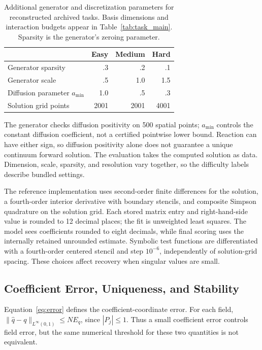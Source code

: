 \documentclass{article}
\begin{document}
\begin{table}[ht]
\caption{Additional generator and discretization parameters for reconstructed
archived tasks. Basis dimensions and interaction budgets appear in
Table~\ref{tab:task_main}. Sparsity is the generator's zeroing parameter.}
\label{tab:difficulty}
\centering\small
\begin{tabular}{@{}lrrr@{}}
\toprule
 & Easy & Medium & Hard\\
\midrule
Generator sparsity & .3 & .2 & .1\\
Generator scale & .5 & 1.0 & 1.5\\
Diffusion parameter \(a_{\min}\) & 1.0 & .5 & .3\\
Solution grid points & 2001 & 2001 & 4001\\
\bottomrule
\end{tabular}
\end{table}

The generator checks diffusion positivity on 500 spatial points;
\(a_{\min}\) controls the constant diffusion coefficient, not a certified
pointwise lower bound. Reaction can have either sign, so diffusion positivity
alone does not guarantee a unique continuum forward solution. The evaluation
takes the computed solution as data. Dimension, scale, sparsity, and resolution
vary together, so the difficulty labels describe bundled settings.

The reference implementation uses second-order finite differences for the
solution, a fourth-order interior derivative with boundary stencils, and
composite Simpson quadrature on the solution grid. Each stored matrix entry and
right-hand-side value is rounded to 12 decimal places; the fit is unweighted
least squares. The model sees coefficients rounded to eight decimals, while
final scoring uses the internally retained unrounded estimate. Symbolic test
functions are differentiated with a fourth-order centered stencil and step
\(10^{-6}\), independently of solution-grid spacing. These choices affect
recovery when singular values are small.

\subsection{Coefficient Error, Uniqueness, and Stability}
\label{sec:identifiability}

Equation~\eqref{eq:error} defines the coefficient-coordinate error. For each
field, \(\|\widehat q-q\|_{L^\infty(0,1)}\le NE_q\), since
\(|P_j|\le1\). Thus a small coefficient error controls field error, but the
same numerical threshold for these two quantities is not equivalent.
\end{document}
